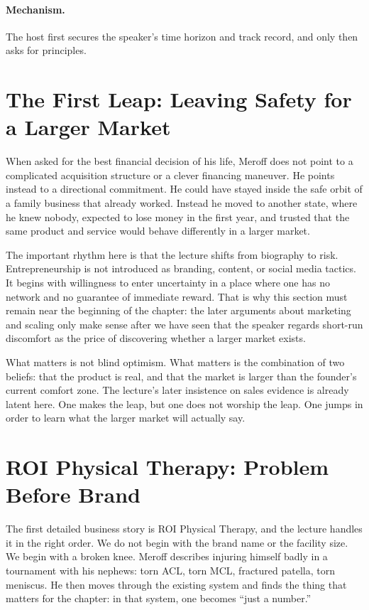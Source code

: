 \paragraph{Mechanism.}
The host first secures the speaker's time horizon and track record, and only then asks for principles.

\section{The First Leap: Leaving Safety for a Larger Market}

When asked for the best financial decision of his life, Meroff does not point to a complicated acquisition structure or a clever financing maneuver. He points instead to a directional commitment. He could have stayed inside the safe orbit of a family business that already worked. Instead he moved to another state, where he knew nobody, expected to lose money in the first year, and trusted that the same product and service would behave differently in a larger market.

The important rhythm here is that the lecture shifts from biography to risk. Entrepreneurship is not introduced as branding, content, or social media tactics. It begins with willingness to enter uncertainty in a place where one has no network and no guarantee of immediate reward. That is why this section must remain near the beginning of the chapter: the later arguments about marketing and scaling only make sense after we have seen that the speaker regards short-run discomfort as the price of discovering whether a larger market exists.

What matters is not blind optimism. What matters is the combination of two beliefs: that the product is real, and that the market is larger than the founder's current comfort zone. The lecture's later insistence on sales evidence is already latent here. One makes the leap, but one does not worship the leap. One jumps in order to learn what the larger market will actually say.

\section{ROI Physical Therapy: Problem Before Brand}

The first detailed business story is ROI Physical Therapy, and the lecture handles it in the right order. We do not begin with the brand name or the facility size. We begin with a broken knee. Meroff describes injuring himself badly in a tournament with his nephews: torn ACL, torn MCL, fractured patella, torn meniscus. He then moves through the existing system and finds the thing that matters for the chapter: in that system, one becomes ``just a number.''

